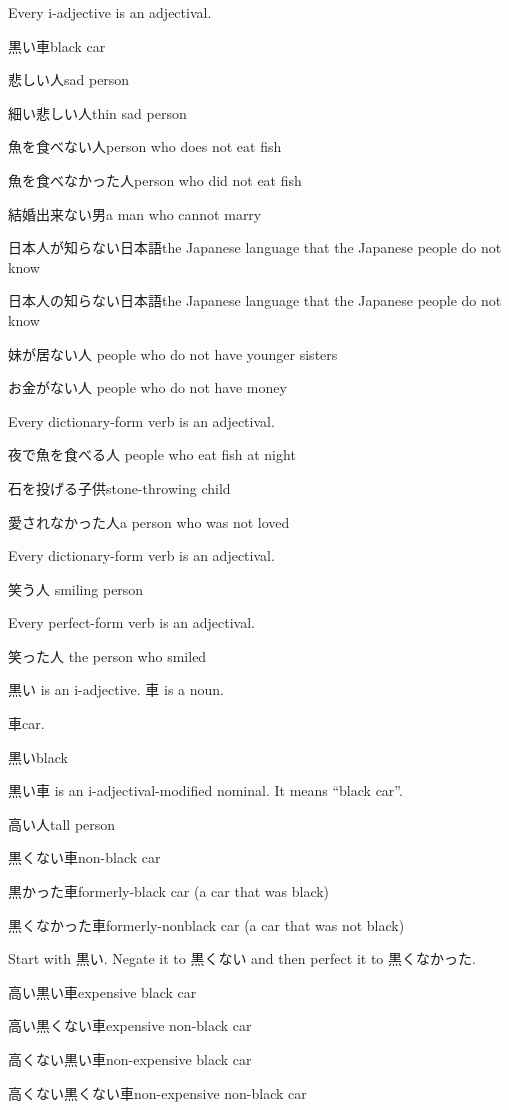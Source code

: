 Every i-adjective is an adjectival.

黒い車black car

悲しい人sad person

細い悲しい人thin sad person

魚を食べない人person who does not eat fish

魚を食べなかった人person who did not eat fish

結婚出来ない男a man who cannot marry

日本人が知らない日本語the Japanese language that the Japanese people do not know

日本人の知らない日本語the Japanese language that the Japanese people do not know

妹が居ない人
people who do not have younger sisters

お金がない人
people who do not have money

Every dictionary-form verb is an adjectival.

夜で魚を食べる人
people who eat fish at night

石を投げる子供stone-throwing child

愛されなかった人a person who was not loved

Every dictionary-form verb is an adjectival.

笑う人 smiling person

Every perfect-form verb is an adjectival.

笑った人 the person who smiled

黒い is an i-adjective.
車 is a noun.

車car.

黒いblack

黒い車 is an i-adjectival-modified nominal. It means ``black car''.

高い人tall person

黒くない車non-black car

黒かった車formerly-black car (a car that was black)

黒くなかった車formerly-nonblack car (a car that was not black)

Start with 黒い. Negate it to 黒くない
and then perfect it to 黒くなかった.

高い黒い車expensive black car

高い黒くない車expensive non-black car

高くない黒い車non-expensive black car

高くない黒くない車non-expensive non-black car

